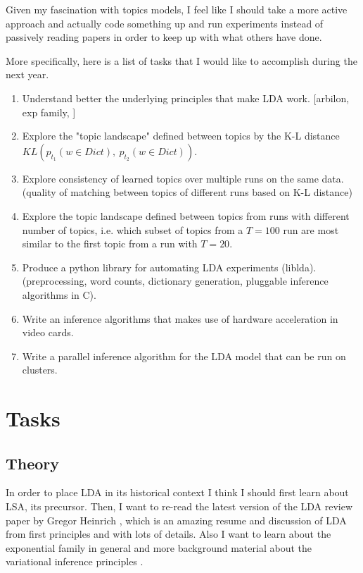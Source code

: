 \documentclass[letterpaper,12pt]{article}
\begin{document}
	Given my fascination with topics models, I feel like I should take a more
	active approach and actually code something up and run experiments 
	instead of passively reading papers in order to keep up with what others have done.

	More specifically, here is a list of tasks that I would like to accomplish
	during the next year.
	
	\begin{enumerate}
		\item	Understand better the underlying principles 
				that make LDA work. [arbilon, exp family, ]
		\item	Explore the "topic landscape" defined between
				topics by the K-L distance ${KL}(p_{t_1}(w\in Dict),\ p_{t_2}(w \in Dict))$.
		\item	Explore consistency of learned topics over multiple runs on the same
				data. (quality of matching between topics of different runs based on K-L distance)
		\item	Explore the topic landscape defined between topics from runs with different
				number of topics, i.e. which subset of topics from a $T=100$ run are most 
				similar to the first topic from a run with $T=20$. 
		\item	Produce a python library for automating LDA
				experiments (liblda).
				(preprocessing, word counts, dictionary generation, 
				pluggable inference algorithms in C).
		\item	Write an inference algorithms that makes use of hardware acceleration
				in video cards.
		\item	Write a parallel inference algorithm for the LDA model that
				can be run on clusters.
	\end{enumerate}
	
	
	
\section{Tasks}


	\subsection{Theory}
	
		In order to place LDA in its historical context I think I should first learn about LSA, its 
		precursor.
		Then, I want to re-read the latest version of the LDA review paper by Gregor Heinrich \cite{heinrich2005parameter},
		which is an amazing resume and discussion of LDA from first principles and with lots of details.
		Also I want to learn about the exponential family in general and more background material
		about the variational inference principles  \cite{wainwright2008graphical}.
		
\end{document}
